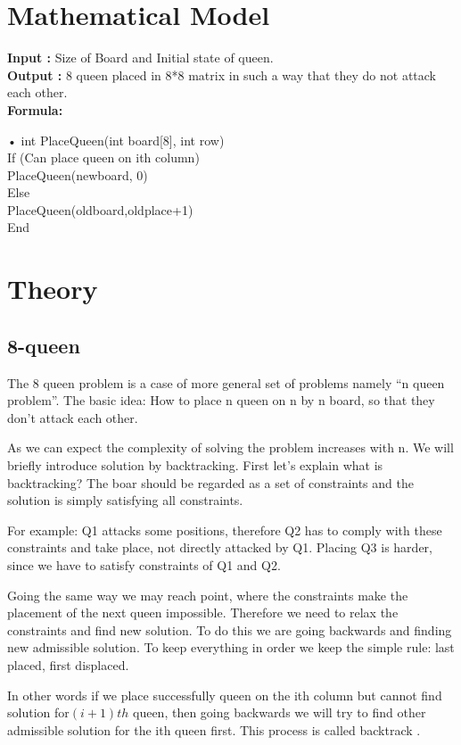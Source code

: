 \documentclass[a4paper,12pt]{article}
\begin{document}
\section{Mathematical Model}
	\begin{flushleft}
		\textbf{Input : }  Size of Board and Initial state of queen.\\
		\textbf{Output : } 8 queen placed in 8*8 matrix in such a way that they do not attack each other.\\
		\textbf{Formula:}
	\end{flushleft}•
	int PlaceQueen(int board[8], int row)  \\
	If (Can place queen on ith column)  \\
	PlaceQueen(newboard, 0)\\
	Else  \\
	PlaceQueen(oldboard,oldplace+1) \\
	End
	
\section{Theory}

\subsection{8-queen}
	The 8 queen problem is a case of more general set of problems namely “n queen problem”. The basic idea: How to place n queen on n by n board, so that they don’t attack each other.
	
	As we can expect the complexity of solving the problem increases with n. We will briefly introduce solution by backtracking.  First let’s explain what is backtracking? The boar should be regarded as a set of constraints and the solution is simply satisfying all constraints. 
	
	For example: Q1 attacks some positions, therefore Q2 has to comply with these constraints and take place, not directly attacked by Q1. Placing Q3 is harder, since we have to satisfy constraints of Q1 and Q2. 
	
	Going the same way we may reach point, where the constraints make the placement of the next queen impossible. Therefore we need to relax the constraints and find new solution. To do this we are going backwards and finding new admissible solution. To keep everything in order we keep the simple rule: last placed, first displaced. 
	
	In other words if we place successfully queen on the ith column but cannot find solution for$ (i+1)th$ queen, then going backwards we will try to find other admissible solution for the ith queen first. This process is called backtrack  .\\
		
\end{document}
